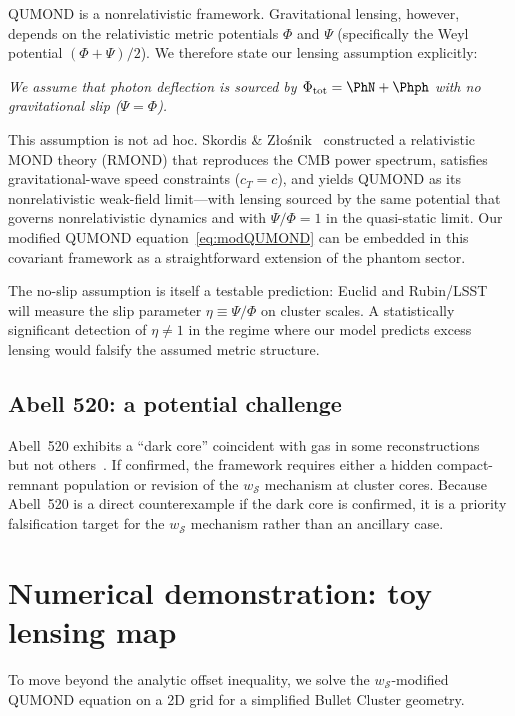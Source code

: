 \documentclass[aps,prd,twocolumn,superscriptaddress,nofootinbib]{revtex4-2}
\newcommand{\wS}{w_{\mathcal{S}}}
\begin{document}
QUMOND is a nonrelativistic framework. Gravitational lensing, however, depends on the relativistic metric potentials $\Phi$ and $\Psi$ (specifically the Weyl potential $(\Phi+\Psi)/2$). We therefore state our lensing assumption explicitly:

\emph{We assume that photon deflection is sourced by $\Phi_{\rm tot}=\PhN+\Phph$ with no gravitational slip ($\Psi=\Phi$).}

This assumption is not ad hoc. Skordis \& Z\l{}o\'snik~\cite{Skordis2021} constructed a relativistic MOND theory (RMOND) that reproduces the CMB power spectrum, satisfies gravitational-wave speed constraints ($c_T=c$), and yields QUMOND as its nonrelativistic weak-field limit---with lensing sourced by the same potential that governs nonrelativistic dynamics and with $\Psi/\Phi=1$ in the quasi-static limit. Our modified QUMOND equation~\eqref{eq:modQUMOND} can be embedded in this covariant framework as a straightforward extension of the phantom sector.

The no-slip assumption is itself a testable prediction: Euclid and Rubin/LSST will measure the slip parameter $\eta\equiv\Psi/\Phi$ on cluster scales. A statistically significant detection of $\eta\neq 1$ in the regime where our model predicts excess lensing would falsify the assumed metric structure.

\subsection{Abell 520: a potential challenge}

Abell~520 exhibits a ``dark core'' coincident with gas in some reconstructions~\cite{Jee2014} but not others~\cite{Clowe2012}. If confirmed, the framework requires either a hidden compact-remnant population or revision of the $\wS$ mechanism at cluster cores. Because Abell~520 is a direct counterexample if the dark core is confirmed, it is a priority falsification target for the $\wS$ mechanism rather than an ancillary case.

\section{Numerical demonstration: toy lensing map}
\label{sec:numerical}

To move beyond the analytic offset inequality, we solve the $\wS$-modified QUMOND equation on a 2D grid for a simplified Bullet Cluster geometry.
\end{document}
